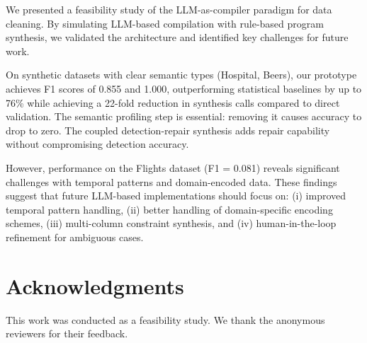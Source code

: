 \documentclass{article}
\begin{document}
We presented a feasibility study of the LLM-as-compiler paradigm for data cleaning. By simulating LLM-based compilation with rule-based program synthesis, we validated the architecture and identified key challenges for future work.

On synthetic datasets with clear semantic types (Hospital, Beers), our prototype achieves F1 scores of 0.855 and 1.000, outperforming statistical baselines by up to 76\% while achieving a 22-fold reduction in synthesis calls compared to direct validation. The semantic profiling step is essential: removing it causes accuracy to drop to zero. The coupled detection-repair synthesis adds repair capability without compromising detection accuracy.

However, performance on the Flights dataset (F1 = 0.081) reveals significant challenges with temporal patterns and domain-encoded data. These findings suggest that future LLM-based implementations should focus on: (i) improved temporal pattern handling, (ii) better handling of domain-specific encoding schemes, (iii) multi-column constraint synthesis, and (iv) human-in-the-loop refinement for ambiguous cases.

\section*{Acknowledgments}

This work was conducted as a feasibility study. We thank the anonymous reviewers for their feedback.
\end{document}
